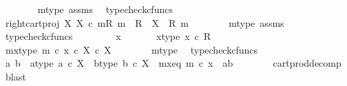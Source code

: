 \begin{isabellebody}
\ \ \ \ \ \ \isamarkupfalse%
\ m{\isacharunderscore}{\kern0pt}type\ assms\ \isamarkupfalse%
\ typecheck{\isacharunderscore}{\kern0pt}cfuncs\isanewline
\ \ \ \ \isamarkupfalse%
\ {\isachardoublequoteopen}{\isacharbrackleft}{\kern0pt}right{\isacharunderscore}{\kern0pt}cart{\isacharunderscore}{\kern0pt}proj\ X\ X\ {\isasymcirc}\isactrlsub c\ m{\isacharbrackright}{\kern0pt}\isactrlbsub {\isacharparenleft}{\kern0pt}R{\isacharcomma}{\kern0pt}\ m{\isacharparenright}{\kern0pt}\isactrlesub \ {\isacharcolon}{\kern0pt}\ R\ {\isasymrightarrow}\ X\ {\isasymsslash}\ {\isacharparenleft}{\kern0pt}R{\isacharcomma}{\kern0pt}\ m{\isacharparenright}{\kern0pt}{\isachardoublequoteclose}\isanewline
\ \ \ \ \ \ \isamarkupfalse%
\ m{\isacharunderscore}{\kern0pt}type\ assms\ \isamarkupfalse%
\ typecheck{\isacharunderscore}{\kern0pt}cfuncs\isanewline
\ \ \isamarkupfalse%
\isanewline
\ \ \ \ \isamarkupfalse%
\ x\ \isanewline
\ \ \ \ \isamarkupfalse%
\ x{\isacharunderscore}{\kern0pt}type{\isacharcolon}{\kern0pt}\ {\isachardoublequoteopen}x\ {\isasymin}\isactrlsub c\ R{\isachardoublequoteclose}\isanewline
\ \ \ \ \isamarkupfalse%
\ \isamarkupfalse%
\ m{\isacharunderscore}{\kern0pt}x{\isacharunderscore}{\kern0pt}type{\isacharcolon}{\kern0pt}\ {\isachardoublequoteopen}m\ {\isasymcirc}\isactrlsub c\ x\ {\isasymin}\isactrlsub c\ X\ {\isasymtimes}\isactrlsub c\ X{\isachardoublequoteclose}\isanewline
\ \ \ \ \ \ \isamarkupfalse%
\ m{\isacharunderscore}{\kern0pt}type\ \isamarkupfalse%
\ typecheck{\isacharunderscore}{\kern0pt}cfuncs\isanewline
\ \ \ \ \isamarkupfalse%
\ \isamarkupfalse%
\ a\ b\ \ a{\isacharunderscore}{\kern0pt}type{\isacharcolon}{\kern0pt}\ {\isachardoublequoteopen}a\ {\isasymin}\isactrlsub c\ X{\isachardoublequoteclose}\ \ b{\isacharunderscore}{\kern0pt}type{\isacharcolon}{\kern0pt}\ {\isachardoublequoteopen}b\ {\isasymin}\isactrlsub c\ X{\isachardoublequoteclose}\ \ m{\isacharunderscore}{\kern0pt}x{\isacharunderscore}{\kern0pt}eq{\isacharcolon}{\kern0pt}\ {\isachardoublequoteopen}m\ {\isasymcirc}\isactrlsub c\ x\ {\isacharequal}{\kern0pt}\ {\isasymlangle}a{\isacharcomma}{\kern0pt}b{\isasymrangle}{\isachardoublequoteclose}\isanewline
\ \ \ \ \ \ \isamarkupfalse%
\ cart{\isacharunderscore}{\kern0pt}prod{\isacharunderscore}{\kern0pt}decomp\ \isamarkupfalse%
\ blast\isanewline

\end{isabellebody}
